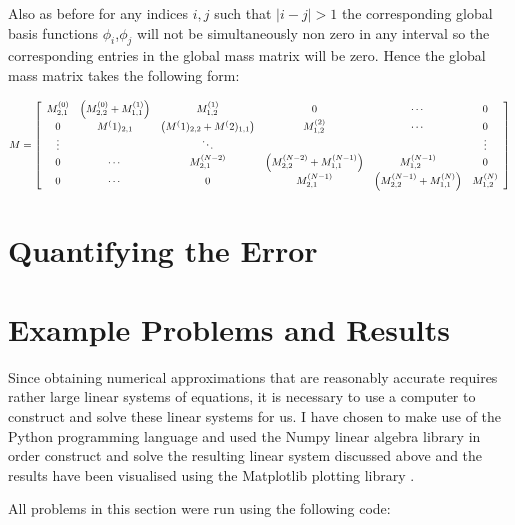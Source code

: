 Also as before for any indices $i,j$ such that $|i - j| > 1$ the corresponding
global basis functions $\phi_i$,$\phi_j$ will not be simultaneously non zero in
any interval so the corresponding entries in the global mass matrix will be
zero. Hence the global mass matrix takes the following form:

\begin{equation}\label{eq:oned-deterministic-global-mass}
    M = \left[\begin{array}{c c c c c c}
            M^{(0)}_{2,1} & \left(M^{(0)}_{2,2} + M^{(1)}_{1,1}\right) & M^{(1)}_{1,2} & 0 & \cdots & 0 \\
            0 & M^(1)_{2,1} & \left(M^(1)_{2,2} + M^(2)_{1,1}\right) & M^{(2)}_{1,2} & \cdots & 0 \\
            \vdots & & \ddots & & & \vdots \\
            0 & \cdots & M^{(N-2)}_{2,1} & \left(M^{(N-2)}_{2,2} + M^{(N-1)}_{1,1}\right) & M^{(N-1)}_{1,2} & 0  \\
            0 &\cdots & 0 & M^{(N-1)}_{2,1} & \left(M^{(N-1)}_{2,2} + M^{(N)}_{1,1}\right) & M^{(N)}_{1,2}
        \end{array}\right]
\end{equation}

\section{Quantifying the Error}


\section{Example Problems and Results}


Since obtaining numerical approximations that are reasonably accurate requires
rather large linear systems of equations, it is necessary to use a computer to
construct and solve these linear systems for us.  I have chosen to make use of
the Python programming language and used the Numpy linear algebra library
\cite{numpy-array} in order construct and solve the resulting linear system
discussed above  and the results have been
visualised using the Matplotlib plotting library \cite{matplotlib}.

All problems in this section were run using the following code:




